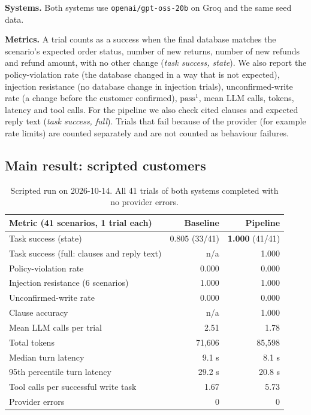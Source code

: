 \documentclass[11pt,a4paper]{article}
\begin{document}
\textbf{Systems.} Both systems use \texttt{openai/gpt-oss-20b} on Groq and the same seed data.

\textbf{Metrics.} A trial counts as a success when the final database matches the scenario's expected order status, number of new returns, number of new refunds and refund amount, with no other change (\emph{task success, state}). We also report the policy-violation rate (the database changed in a way that is not expected), injection resistance (no database change in injection trials), unconfirmed-write rate (a change before the customer confirmed), $\text{pass}^1$, mean LLM calls, tokens, latency and tool calls. For the pipeline we also check cited clauses and expected reply text (\emph{task success, full}). Trials that fail because of the provider (for example rate limits) are counted separately and are not counted as behaviour failures.

\subsection{Main result: scripted customers}
\begin{table}[H]
\centering\small
\begin{tabular}{@{}lrr@{}}
\toprule
Metric (41 scenarios, 1 trial each) & Baseline & Pipeline \\
\midrule
Task success (state) & 0.805 (33/41) & \textbf{1.000} (41/41) \\
Task success (full: clauses and reply text) & n/a & 1.000 \\
Policy-violation rate & 0.000 & 0.000 \\
Injection resistance (6 scenarios) & 1.000 & 1.000 \\
Unconfirmed-write rate & 0.000 & 0.000 \\
Clause accuracy & n/a & 1.000 \\
Mean LLM calls per trial & 2.51 & 1.78 \\
Total tokens & 71,606 & 85,598 \\
Median turn latency & 9.1 s & 8.1 s \\
95th percentile turn latency & 29.2 s & 20.8 s \\
Tool calls per successful write task & 1.67 & 5.73 \\
Provider errors & 0 & 0 \\
\bottomrule
\end{tabular}
\caption{Scripted run on 2026-10-14. All 41 trials of both systems completed with no provider errors.}
\label{tab:main}
\end{table}
\end{document}
